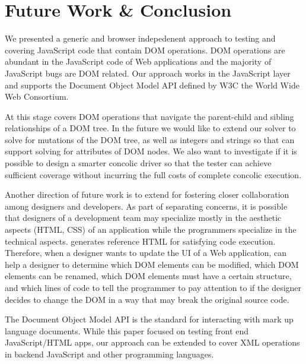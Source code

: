 \section{Future Work \& Conclusion}
We presented a generic and browser indepedenent approach to testing and covering JavaScript code that contain DOM operations.  
DOM operations are abundant in the JavaScript code of Web applications and the majority of JavaScript bugs are DOM related.  
Our approach works in the JavaScript layer and supports the Document Object Model API defined by W3C the World Wide Web Consortium.  

At this stage \tool covers DOM operations that navigate the parent-child and sibling relationships of a DOM tree.  
In the future we would like to extend our solver to solve for mutations of the DOM tree, as well as integers and strings so that \tool can support solving for attributes of DOM nodes.    
We also want to investigate if it is possible to design a smarter concolic driver so that the tester can achieve sufficient coverage without incurring the full costs of complete concolic execution.

Another direction of future work is to extend \tool for fostering closer collaboration among designers and developers.
As part of separating concerns, it is possible that designers of a development team may specialize mostly in the aesthetic aspects (HTML, CSS) of an application while the programmers specialize in the technical aspects.    
\tool generates reference HTML for satisfying code execution.  
Therefore, when a designer wants to update the UI of a Web application, \tool can help a designer to determine 
which DOM elements can be modified, 
which DOM elements can be renamed, 
which DOM elements must have a certain structure, 
and which lines of code to tell the programmer to pay attention to if the designer decides to change the DOM in a way that may break the original source code.  

The Document Object Model API is the standard for interacting with mark up language documents.  
While this paper focused on testing front end JavaScript/HTML apps, our approach can be extended to cover XML operations in backend JavaScript and other programming languages.  
